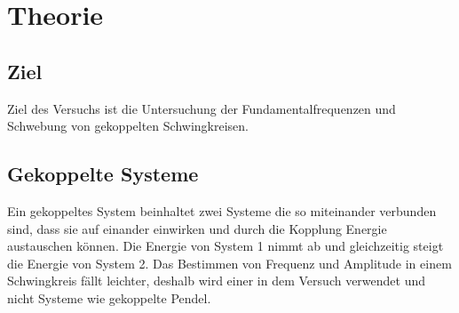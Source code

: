 \section{Theorie}
\label{sec:Theorie}
\subsection{Ziel}
Ziel des Versuchs ist die Untersuchung der Fundamentalfrequenzen und Schwebung von gekoppelten Schwingkreisen.
\subsection{Gekoppelte Systeme}
Ein gekoppeltes System beinhaltet zwei Systeme die so miteinander verbunden sind,
dass sie auf einander einwirken und durch die Kopplung Energie austauschen können.
Die Energie von System 1 nimmt ab und gleichzeitig steigt die Energie von System 2.
Das Bestimmen von Frequenz und Amplitude in einem Schwingkreis fällt leichter,
deshalb wird einer in dem Versuch verwendet und nicht Systeme wie gekoppelte Pendel.\\
